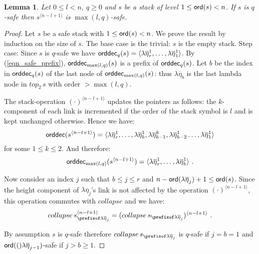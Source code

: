 \documentclass[a4paper]{article}
\newtheorem{lemma}{Lemma}[section]
\theoremstyle{remark}
\theoremstyle{definition}
\newcommand\orddec{{\sf orddec}}
\begin{document}
\begin{lemma}
\label{lem:incrk_qsafe}
Let $0\leq l < n$, $q\geq 0$ and $s$ be a stack of level $1\leq {\sf ord}(s) <n$.
If $s$ is $q$-safe then $s^{\langle n-l+1 \rangle}$ is $\max(l,q)$-safe.
\end{lemma}
\begin{proof}
Let $s$ be a safe stack with $1\leq {\sf ord}(s) <n$. We prove the result by induction on the size of $s$.
The base case is the trivial: $s$ is the empty stack.
Step case: Since $s$ is $q$-safe we have
$\orddec_q(s) = \langle \lambda \overline{\eta}_r^1
, \ldots, \lambda \overline{\eta}_1^1   \rangle$.
By (\ref{eqn_safe_prefix}), $\orddec_{\max(l,q)}(s)$ is a prefix of $\orddec_q(s)$.
Let $b$ be the index in $\orddec_q(s)$ of the last node of $\orddec_{\max(l,q)}(s)$:
thus $\lambda\overline\eta_b$ is the last lambda node in $top_2\, s$ with order $>\max(l,q)$.

The stack-operation $(\cdot)^{\langle n-l+1 \rangle}$ updates the pointers as follows:
the $k$-component of each link is incremented if the order of the stack symbol is $l$ and is kept unchanged otherwise.
Hence we have:
\begin{equation*}
\orddec(s^{\langle n-l+1 \rangle}) = \langle
\lambda \overline{\eta}_r^1, \ldots,  \lambda \overline{\eta}_{b}^1, \lambda \overline{\eta}_{b-1}^{k}, \lambda \overline{\eta}_{b-2}^1 \ldots,
 \lambda \overline{\eta}_1^{1} \rangle
\end{equation*}
for some $1 \leq k\leq 2$. And therefore:
\begin{equation}
\orddec_{\max(l,q)}(s^{\langle n-l+1 \rangle}) = \langle \lambda \overline{\eta}_r^1
, \ldots, \lambda \overline{\eta}_b^1 \rangle\ . \label{eqn:trivialityofcollapse}
\end{equation}

Now consider an index $j$ such that $b\leq j \leq r$ and $n-{\sf ord}(\lambda\overline\eta_j) +1 \leq {\sf ord}(s)$.
Since the height component of $\lambda\overline\eta_j$'s link is not affected by the operation
$(\cdot)^{\langle n-l+1 \rangle}$, this operation commutes with $collapse$ and we have:
\begin{equation}
 collapse\, s^{\langle n-l+1 \rangle}_{\prefixof \lambda \overline{\eta}_{j}}
= (collapse\, s_{\prefixof \lambda \overline{\eta}_{j}})^{\langle n-l+1 \rangle} \ . \label{eqn:commutecollapse}
\end{equation}

By assumption $s$ is $q$-safe therefore $collapse\,s_{\prefixof \lambda \overline{\eta}_{j}}$ is $q$-safe
if $j=b=1$ and ${\sf ord}(()\lambda\overline\eta_{j-1})$-safe if $j>b\geq1$.


\end{proof}
\end{document}
